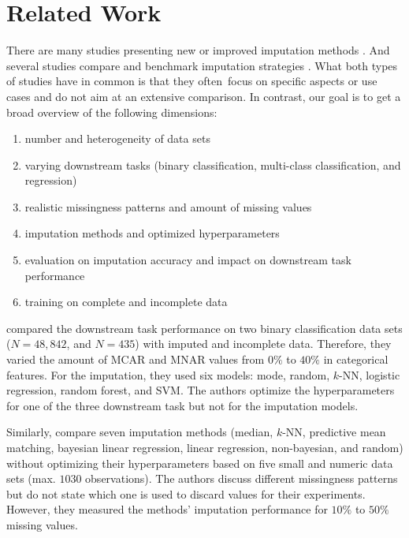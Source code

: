 \section{Related Work}
\label{sec:related_work}
There are many studies presenting new or improved imputation methods \citep{Imputation_Benchmark_4, Imputation_Benchmark_6, GAIN, VAE_for_genomic_data, HIVAE, MisGAN, VIGAN}. And several studies compare and benchmark imputation strategies \citep{Imputation_Benchmark_1, Imputation_Benchmark_2, Imputation_Benchmark_3}. What both types of studies have in common is that they often focus on specific aspects or use cases and do not aim at an extensive comparison. In contrast, our goal is to get a broad overview of the following dimensions:
%
\begin{enumerate}
	\item number and heterogeneity of data sets
	\item varying downstream tasks (binary classification, multi-class classification, and regression)
	\item realistic missingness patterns and amount of missing values
	\item imputation methods and optimized hyperparameters
	\item evaluation on imputation accuracy and impact on downstream task performance
	\item training on complete and incomplete data
\end{enumerate}

\cite{Imputation_Benchmark_3} compared the downstream task performance on two binary classification data sets ($N = 48,842$, and $N = 435$) with imputed and incomplete data. Therefore, they varied the amount of MCAR and MNAR values from $0\%$ to $40\%$ in categorical features. For the imputation, they used six models: mode, random, $k$-NN, logistic regression, random forest, and SVM. The authors optimize the hyperparameters for one of the three downstream task but not for the imputation models.

Similarly, \cite{Imputation_Benchmark_2} compare seven imputation methods (median, $k$-NN, predictive mean matching, bayesian linear regression, linear regression, non-bayesian, and random) without optimizing their hyperparameters based on five small and numeric data sets (max. $1030$ observations). The authors discuss different missingness patterns but do not state which one is used to discard values for their experiments. However, they measured the methods' imputation performance for $10\%$ to $50\%$ missing values.

